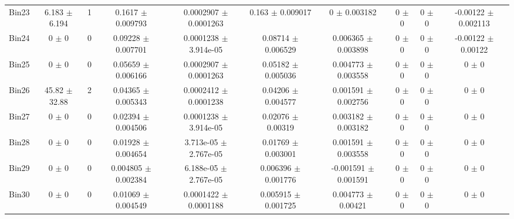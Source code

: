 \begin{tabular}{@{\extracolsep{4pt}}lccccccccc@{}}
     Bin23 & 6.183 $\pm$ 6.194 & 1 & 0.1617 $\pm$ 0.009793 & 0.0002907 $\pm$ 0.0001263 & 0.163 $\pm$ 0.009017 & 0 $\pm$ 0.003182 & 0 $\pm$ 0 & 0 $\pm$ 0 & -0.00122 $\pm$ 0.002113 \\ 
     Bin24 & 0 $\pm$ 0 & 0 & 0.09228 $\pm$ 0.007701 & 0.0001238 $\pm$ 3.914e-05 & 0.08714 $\pm$ 0.006529 & 0.006365 $\pm$ 0.003898 & 0 $\pm$ 0 & 0 $\pm$ 0 & -0.00122 $\pm$ 0.00122 \\ 
     Bin25 & 0 $\pm$ 0 & 0 & 0.05659 $\pm$ 0.006166 & 0.0002907 $\pm$ 0.0001263 & 0.05182 $\pm$ 0.005036 & 0.004773 $\pm$ 0.003558 & 0 $\pm$ 0 & 0 $\pm$ 0 & 0 $\pm$ 0 \\ 
     Bin26 & 45.82 $\pm$ 32.88 & 2 & 0.04365 $\pm$ 0.005343 & 0.0002412 $\pm$ 0.0001238 & 0.04206 $\pm$ 0.004577 & 0.001591 $\pm$ 0.002756 & 0 $\pm$ 0 & 0 $\pm$ 0 & 0 $\pm$ 0 \\ 
     Bin27 & 0 $\pm$ 0 & 0 & 0.02394 $\pm$ 0.004506 & 0.0001238 $\pm$ 3.914e-05 & 0.02076 $\pm$ 0.00319 & 0.003182 $\pm$ 0.003182 & 0 $\pm$ 0 & 0 $\pm$ 0 & 0 $\pm$ 0 \\ 
     Bin28 & 0 $\pm$ 0 & 0 & 0.01928 $\pm$ 0.004654 & 3.713e-05 $\pm$ 2.767e-05 & 0.01769 $\pm$ 0.003001 & 0.001591 $\pm$ 0.003558 & 0 $\pm$ 0 & 0 $\pm$ 0 & 0 $\pm$ 0 \\ 
     Bin29 & 0 $\pm$ 0 & 0 & 0.004805 $\pm$ 0.002384 & 6.188e-05 $\pm$ 2.767e-05 & 0.006396 $\pm$ 0.001776 & -0.001591 $\pm$ 0.001591 & 0 $\pm$ 0 & 0 $\pm$ 0 & 0 $\pm$ 0 \\ 
     Bin30 & 0 $\pm$ 0 & 0 & 0.01069 $\pm$ 0.004549 & 0.0001422 $\pm$ 0.0001188 & 0.005915 $\pm$ 0.001725 & 0.004773 $\pm$ 0.00421 & 0 $\pm$ 0 & 0 $\pm$ 0 & 0 $\pm$ 0 \\ 
\hline\hline
  \end{tabular}
